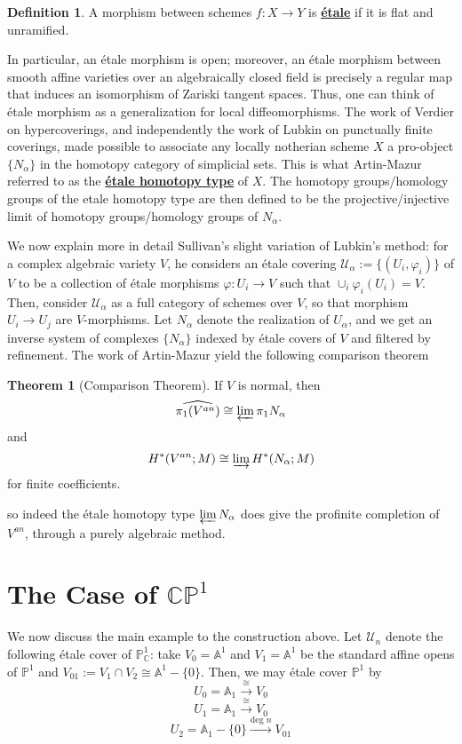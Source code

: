 \documentclass{article}
\theoremstyle{definition}
\newtheorem{theorem}{Theorem}[section]
\theoremstyle{definition}
\newtheorem{definition}{Definition}[theorem]
\theoremstyle{definition}
\theoremstyle{definition}
\theoremstyle{definition}
\theoremstyle{definition}
\theoremstyle{definition}
\begin{document}
\begin{tcolorbox}[colback=purple!5!white,colframe=purple!75!black]
	\begin{definition}
	A morphism between schemes $f: X\to Y$ is \underline{\textbf{\'etale}} if it is flat and unramified.
	\end{definition}
	\end{tcolorbox}
In particular, an \'etale morphism is open; moreover, an \'etale morphism between smooth affine varieties over an algebraically closed field is precisely a regular map that induces an isomorphism of Zariski tangent spaces. Thus, one can think of \'etale morphism as a generalization for local diffeomorphisms. The work of Verdier on hypercoverings, and independently the work of Lubkin on punctually finite coverings, made possible to associate any locally notherian scheme $X$ a pro-object $\{N_{\alpha}\}$ in the homotopy category of simplicial sets. This is what Artin-Mazur referred to as the \underline{\textbf{\'etale homotopy type}} of $X$. The homotopy groups/homology groups of the etale homotopy type are then defined to be the projective/injective limit of homotopy groups/homology groups of $N_{\alpha}$.

We now explain more in detail Sullivan's slight variation of Lubkin's method: for a complex algebraic variety $V$, he considers an \'etale covering $\mathcal{U}_{\alpha}:=\{(U_i,\varphi_i)\}$ of $V$ to be a collection of \'etale morphisms $\varphi: U_i\to V$ such that $\cup_i \varphi_i(U_i)=V$. Then, consider $\mathcal{U}_{\alpha}$ as a full category of schemes over $V$, so that morphism $U_i\to U_j$ are $V$-morphisms. Let $N_{\alpha}$ denote the realization of $U_{\alpha}$, and we get an inverse system of complexes $\{N_{\alpha}\}$ indexed by \'etale covers of $V$ and filtered by refinement. The work of Artin-Mazur yield the following comparison theorem

\begin{tcolorbox}[colback=red!5!white,colframe=red!30!white]
\begin{theorem}[Comparison Theorem]
If $V$ is normal, then 
\[\widehat{\pi_1(V^{an})}\cong \varprojlim \pi_1{N_{\alpha}}\]
and 
\[H^*(V^{an};M)\cong \varinjlim H^*(N_{\alpha};M)\]
for finite coefficients.
\end{theorem}
\end{tcolorbox}
so indeed the \'etale homotopy type $\varprojlim N_{\alpha}$ does give the profinite completion of $V^{an}$, through a purely algebraic method. 

\section{The Case of $\mathbb{CP}^1$}
We now discuss the main example to the construction above. Let $\mathcal{U}_n$ denote the following \'etale cover of $\mathbb{P}^1_{\mathbb{C}}$: take $V_0=\mathbb{A}^1$ and $V_1=\mathbb{A}^1$ be the standard affine opens of $\mathbb{P}^1$ and $V_{01}:=V_1\cap V_2\cong \mathbb{A}^1-\{0\}$. Then, we may \'etale cover $\mathbb{P}^1$ by 
$$U_0=\mathbb{A}_1\xrightarrow{\cong }V_0$$
$$U_1=\mathbb{A}_1\xrightarrow{\cong }V_0$$
$$U_2=\mathbb{A}_1-\{0\}\xrightarrow{\textrm{deg } n }V_{01}$$
\end{document}
